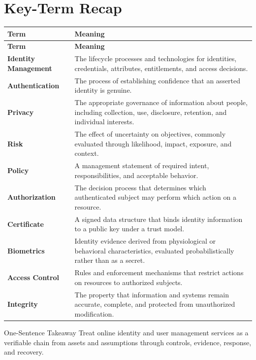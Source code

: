 \documentclass[11pt,letterpaper]{article}
\begin{document}
\section*{Key-Term Recap}
\begin{longtable}{>{\raggedright\arraybackslash}p{}>{\raggedright\arraybackslash}p{}}
\toprule\rowcolor{Navy}\color{white}\textbf{Term} & \color{white}\textbf{Meaning}\\\midrule
\endfirsthead
\toprule\rowcolor{Navy}\color{white}\textbf{Term} & \color{white}\textbf{Meaning}\\\midrule
\endhead
\textbf{Identity Management} & The lifecycle processes and technologies for identities, credentials, attributes, entitlements, and access decisions. \\\midrule
\textbf{Authentication} & The process of establishing confidence that an asserted identity is genuine. \\\midrule
\textbf{Privacy} & The appropriate governance of information about people, including collection, use, disclosure, retention, and individual interests. \\\midrule
\textbf{Risk} & The effect of uncertainty on objectives, commonly evaluated through likelihood, impact, exposure, and context. \\\midrule
\textbf{Policy} & A management statement of required intent, responsibilities, and acceptable behavior. \\\midrule
\textbf{Authorization} & The decision process that determines which authenticated subject may perform which action on a resource. \\\midrule
\textbf{Certificate} & A signed data structure that binds identity information to a public key under a trust model. \\\midrule
\textbf{Biometrics} & Identity evidence derived from physiological or behavioral characteristics, evaluated probabilistically rather than as a secret. \\\midrule
\textbf{Access Control} & Rules and enforcement mechanisms that restrict actions on resources to authorized subjects. \\\midrule
\textbf{Integrity} & The property that information and systems remain accurate, complete, and protected from unauthorized modification. \\\midrule
\bottomrule
\end{longtable}
\begin{CornellExamBox}{One-Sentence Takeaway}
Treat online identity and user management services as a verifiable chain from assets and assumptions through controls, evidence, response, and recovery.
\end{CornellExamBox}
\end{document}
